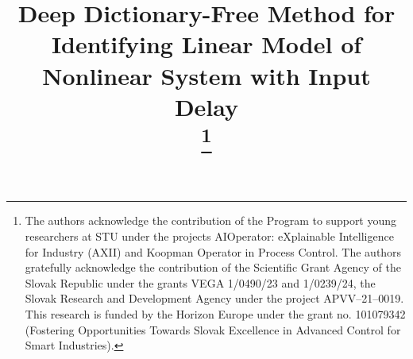 \documentclass[conference]{IEEEtran}
\begin{document}
\title{Deep Dictionary-Free Method for Identifying Linear Model of Nonlinear System with Input Delay\\

    \thanks{The authors acknowledge the contribution of the Program to support young researchers at STU under the projects AIOperator: eXplainable Intelligence for Industry (AXII) and Koopman Operator in Process Control. The authors gratefully acknowledge the contribution of the Scientific Grant Agency of the Slovak Republic under the grants VEGA 1/0490/23 and 1/0239/24, the Slovak Research and Development Agency under the project APVV--21--0019. This research is funded by the Horizon Europe under the grant no. 101079342 (Fostering Opportunities Towards Slovak Excellence in Advanced Control for Smart Industries).}
}

\author{
}

\maketitle
\end{document}
